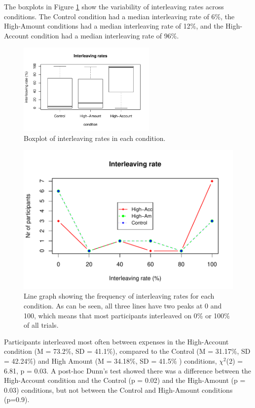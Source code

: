 The boxplots in Figure \ref{fig:ch34_4-boxplots} show the variability of interleaving rates across conditions. The Control condition had a median interleaving rate of 6\%, the High-Amount conditions had a median interleaving rate of 12\%, and the High-Account condition had a median interleaving rate of 96\%.

\begin{figure}
 \includegraphics[width=0.6\textwidth]{images/ch34/ch4_4-boxplot.pdf}
\caption{Boxplot of interleaving rates in each condition.}
\label{fig:ch34_4-boxplots}
\end{figure}

\begin{figure}
 \includegraphics[width=\textwidth]{images/ch34/ch34-4_linechart.pdf}
\caption{Line graph showing the frequency of interleaving rates for each condition. As can be seen, all three lines have two peaks at 0 and 100, which means that most participants interleaved on 0\% or 100\% of all trials.}
\label{fig:ch34_4-linechart}
\end{figure}

Participants interleaved most often between expenses in the High-Account condition (M = 73.2\%, SD = 41.1\%), compared to the Control (M = 31.17\%, SD = 42.24\%) and High Amount (M = 34.18\%, SD = 41.5\% ) conditions, $\chi^2$(2) = 6.81, p = 0.03. A post-hoc Dunn's test showed there was a difference between the High-Account condition and the Control (p = 0.02) and the High-Amount (p = 0.03) conditions, but not between the Control and High-Amount conditions (p=0.9).

